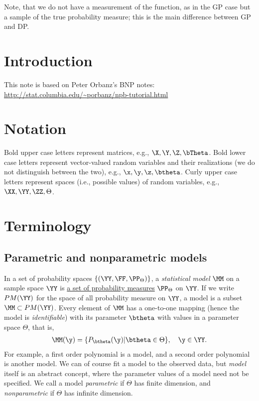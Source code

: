 \documentclass{book}
\begin{document}
Note, that we do not have a measurement of the function, as in the GP case but a sample of the true probability measure; this is the main difference between GP and DP.

\section{Introduction}
This note is based on Peter Orbanz's BNP notes:
\vspace*{5mm}
\\
\url{http://stat.columbia.edu/~porbanz/npb-tutorial.html}

\section{Notation}
Bold upper case letters represent matrices, e.g., $\X, \Y, \Z, \bTheta$. Bold lower case letters represent vector-valued random variables and their realizations (we do not distinguish between the two), e.g., $\x, \y, \z, \btheta$. Curly upper case letters represent spaces (i.e., possible values) of random variables, e.g., $\XX, \YY, \ZZ, \Theta$.

\section{Terminology}
\subsection{Parametric and nonparametric models}
In a set of probability spaces $\{(\YY, \FF, \PP_\Theta)\}$, a {\em{statistical model}} $\MM$ on a sample space $\YY$ is {\underline{a set of probability measures}} $\PP_\Theta$ on $\YY$. If we write $PM(\YY)$ for the space of all probability measure on $\YY$, a model is a subset $\MM \subset PM(\YY)$. Every element of $\MM$ has a one-to-one mapping (hence the model is {\em{identifiable}}) with its parameter $\btheta$ with values in a parameter space $\Theta$, that is,
\begin{align}
\MM(\y) = \{P_\btheta(\y) | \btheta \in \Theta\},\quad \y \in \YY.
\end{align}
For example, a first order polynomial is a model, and a second order polynomial is another model. We can of course fit a model to the observed data, but {\em{model}} itself is an abstract concept, where the parameter values of a model need not be specified. We call a model {\em{parametric}} if $\Theta$ has finite dimension, and {\em{nonparametric}} if $\Theta$ has infinite dimension.
\end{document}
